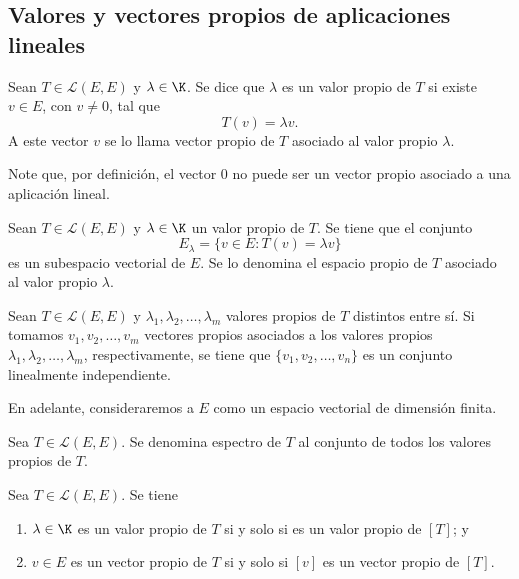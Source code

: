 \documentclass[a4,11pt]{aleph-notas}
\begin{document}
\subsection{Valores y vectores propios de aplicaciones lineales}

\begin{defi}
     Sean $T \in \mathcal{L}(E,E)$ y $\lambda \in\K$. Se dice que $\lambda$ es un valor propio de $T$ si existe $v\in E$, con $v\neq 0$, tal que
     \[
        T(v) = \lambda v.
     \]
     A este vector $v$ se lo llama vector propio de $T$ asociado al valor propio $\lambda$.
\end{defi}

\begin{advertencia}
    Note que, por definición, el vector $0$ no puede ser un vector propio asociado a una aplicación lineal.
\end{advertencia}

\begin{teo}
    Sean $T \in \mathcal{L}(E,E)$ y $\lambda \in\K$ un valor propio de $T$. Se tiene que el conjunto
    \[
        E_\lambda = \{ v\in E : T(v) = \lambda v\} 
    \]
    es un subespacio vectorial de $E$. Se lo denomina el espacio propio de $T$ asociado al valor propio $\lambda$.
\end{teo}


\begin{teo}
    Sean $T \in \mathcal{L}(E,E)$ y $\lambda_1, \lambda_2, \ldots, \lambda_m$ valores propios de $T$ distintos entre sí. Si tomamos $v_1, v_2, \ldots, v_m$ vectores propios asociados a los valores propios $\lambda_1, \lambda_2, \ldots, \lambda_m$, respectivamente, se tiene que $\{v_1, v_2, \ldots, v_n\}$ es un conjunto linealmente independiente. 
\end{teo}


En adelante, consideraremos a $E$ como un espacio vectorial de dimensión finita.

\begin{defi}
     Sea $T \in \mathcal{L}(E,E)$. Se denomina espectro de $T$ al conjunto de todos los valores propios de $T$.
\end{defi}


\begin{teo}
    Sea $T \in \mathcal{L}(E,E)$. Se tiene 
    \begin{enumerate}
    \item
        $\lambda\in\K$ es un valor propio de $T$ si y solo si es un valor propio de $[T]$; y
    \item
        $v\in E$ es un vector propio de $T$ si y solo si $[v]$ es un vector propio de $[T]$.
    \end{enumerate}
\end{teo}
\end{document}

